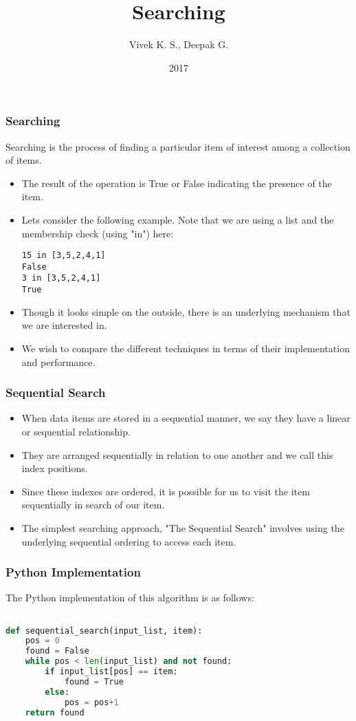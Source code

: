 \documentclass{beamer}
\title{Searching}
\author{Vivek K. S., Deepak G.}
\institute{Information Systems Decision Sciences (ISDS)\\
MUMA College of Business\\
University of South Florida \\
Tampa, Florida}
\date{2017}
\begin{document}
\frame{\titlepage}

\begin{frame}[fragile]
\frametitle{Searching}
Searching is the process of finding a particular item of interest among a collection of items.
\begin{itemize}
\item The result of the operation is True or False indicating the presence of the item.
\item Lets consider the following example. Note that we are using a list and the membership check (using "in") here:
\begin{lstlisting}
15 in [3,5,2,4,1]
False
3 in [3,5,2,4,1]
True
\end{lstlisting}
\item Though it looks simple on the outside, there is an underlying mechanism that we are interested in.
\item We wish to compare the different techniques in terms of their implementation and performance.
\end{itemize}
\end{frame}


\begin{frame}[fragile]
\frametitle{Sequential Search}
\begin{itemize}
\item When data items are stored in a sequential manner, we say they have a linear or sequential relationship.
\item They are arranged sequentially in relation to one another and we call this index positions.
\item Since these indexes are ordered, it is possible for us to visit the item sequentially in search of our item.
\item The simplest searching approach, "The Sequential Search" involves using the underlying sequential ordering to access each item.
\end{itemize}
\end{frame}


\begin{frame}[fragile]
\frametitle{Python Implementation}
The Python implementation of this algorithm is as follows:
\begin{lstlisting}[language=Python]

def sequential_search(input_list, item):
    pos = 0
    found = False
    while pos < len(input_list) and not found:
        if input_list[pos] == item:
            found = True
        else:
            pos = pos+1
    return found
\end{lstlisting}
\end{frame}
\end{document}
